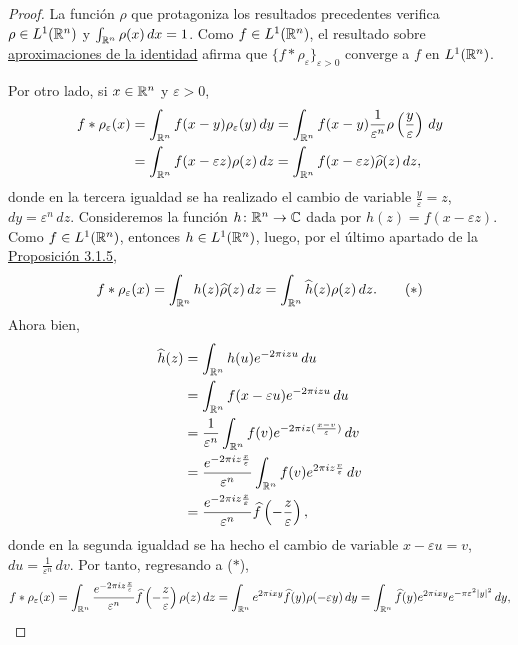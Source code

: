 \documentclass[a4paper, 11pt, oneside]{report}
\begin{document}
\begin{proof}
  La función $\rho$ que protagoniza los resultados precedentes verifica $\rho \in L^1(\mathbb R^n)$ y $\int_{\mathbb R^n} \rho(x) \, dx = 1$. Como $f \in L^1(\mathbb R^n)$, el resultado sobre \hyperref[cor:2.3.6]{\color{c1}aproximaciones de la identidad} afirma que $\{f \ast \rho_\varepsilon\}_{\varepsilon > 0}$ converge a $f$ en $L^1(\mathbb R^n)$.

  Por otro lado, si $x \in \mathbb R^n$ y $\varepsilon > 0$,
  \[\begin{aligned}[t]
    f \ast \rho_\varepsilon(x) &= \int_{\mathbb R^n} f(x-y)\rho_\varepsilon(y) \, dy 
    = \int_{\mathbb R^n} f(x-y)\frac{1}{\varepsilon^n}\rho\left(\frac{y}{\varepsilon}\right) \, dy \\ 
    &= \int_{\mathbb R^n} f(x-\varepsilon z) \rho(z) \, dz = \int_{\mathbb R^n} f(x-\varepsilon z) \widehat{\rho}(z) \, dz,
  \end{aligned}\]
  donde en la tercera igualdad se ha realizado el cambio de variable $\frac{y}{\varepsilon}= z$, $dy = \varepsilon^n\,dz$. Consideremos la función $h \colon \mathbb R^n \to \mathbb C$ dada por $h(z) = f(x-\varepsilon z)$. Como $f \in L^1(\mathbb R^n)$, entonces $h\in L^1(\mathbb R^n)$, luego, por el último apartado de la \hyperref[pro:3.1.5]{\color{c1}Proposición 3.1.5},
  \[f \ast \rho_\varepsilon(x) = \int_{\mathbb R^n} h(z) \widehat{\rho}(z) \, dz = \int_{\mathbb R^n} \widehat{h}(z) \rho(z) \, dz. \tag{$\ast$}\]
  Ahora bien,
  \[\begin{aligned}[t]
    \widehat{h}(z) &= \int_{\mathbb R^n}h(u)e^{-2\pi i zu} \, du \\
    &= \int_{\mathbb R^n} f(x - \varepsilon u)e^{-2\pi i zu} \, du \\
    &= \frac{1}{\varepsilon^n}\int_{\mathbb R^n} f(v)e^{-2\pi iz(\frac{x-v}{\varepsilon})} \, dv \\
    &= \frac{e^{-2\pi iz \frac{x}{\varepsilon}}}{\varepsilon^n} \int_{\mathbb R^n} f(v) e^{2\pi i z \frac{v}{\varepsilon}} \, dv \\
    &= \frac{e^{-2\pi i z\frac{x}{\varepsilon}}}{\varepsilon^n} \widehat{f}\left(-\frac{z}{\varepsilon}\right),
  \end{aligned}\]
  donde en la segunda igualdad se ha hecho el cambio de variable $x - \varepsilon u = v$, $du = \frac{1}{\varepsilon^n} \, dv$.
  Por tanto, regresando a ($\ast$),
  \[f \ast \rho_\varepsilon(x) = \int_{\mathbb R^n}\frac{e^{-2\pi i z\frac{x}{\varepsilon}}}{\varepsilon^n} \widehat{f}\left(-\frac{z}{\varepsilon}\right) \rho(z) \, dz = \int_{\mathbb R^n} e^{2\pi i xy}\widehat{f}(y)\rho(-\varepsilon y) \, dy =\int_{\mathbb R^n} \widehat{f}(y)e^{2\pi i xy} e^{-\pi \varepsilon^2|y|^2} \, dy, \]

\end{proof}
\end{document}
